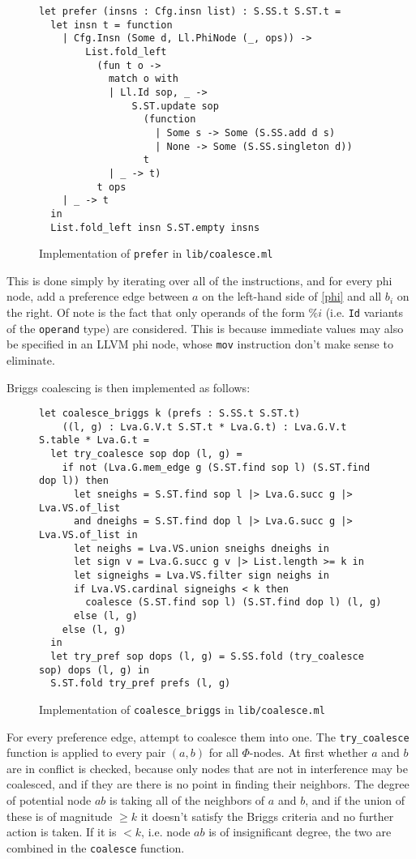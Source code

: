 \documentclass{article}
\begin{document}
\begin{figure}[H]
  \centering
  \begin{verbatim}
let prefer (insns : Cfg.insn list) : S.SS.t S.ST.t =
  let insn t = function
    | Cfg.Insn (Some d, Ll.PhiNode (_, ops)) ->
        List.fold_left
          (fun t o ->
            match o with
            | Ll.Id sop, _ ->
                S.ST.update sop
                  (function
                    | Some s -> Some (S.SS.add d s)
                    | None -> Some (S.SS.singleton d))
                  t
            | _ -> t)
          t ops
    | _ -> t
  in
  List.fold_left insn S.ST.empty insns
  \end{verbatim}
  \caption{Implementation of \texttt{prefer} in \texttt{lib/coalesce.ml}}\label{fig:prefer.ml}
\end{figure}
\noindent This is done simply by iterating over all of the instructions, and for every phi node, add a preference edge between \(a\) on the left-hand side of \eqref{phi} and all \(b_i\) on the right. Of note is the fact that only operands of the form \(\%i\) (i.e. \texttt{Id} variants of the \texttt{operand} type) are considered. This is because immediate values may also be specified in an LLVM phi node, whose \texttt{mov} instruction  don't make sense to eliminate. %

Briggs coalescing is then implemented as follows:
\begin{figure}[H]
  \centering
  \begin{verbatim}
let coalesce_briggs k (prefs : S.SS.t S.ST.t)
    ((l, g) : Lva.G.V.t S.ST.t * Lva.G.t) : Lva.G.V.t S.table * Lva.G.t =
  let try_coalesce sop dop (l, g) =
    if not (Lva.G.mem_edge g (S.ST.find sop l) (S.ST.find dop l)) then
      let sneighs = S.ST.find sop l |> Lva.G.succ g |> Lva.VS.of_list
      and dneighs = S.ST.find dop l |> Lva.G.succ g |> Lva.VS.of_list in
      let neighs = Lva.VS.union sneighs dneighs in
      let sign v = Lva.G.succ g v |> List.length >= k in
      let signeighs = Lva.VS.filter sign neighs in
      if Lva.VS.cardinal signeighs < k then
        coalesce (S.ST.find sop l) (S.ST.find dop l) (l, g)
      else (l, g)
    else (l, g)
  in
  let try_pref sop dops (l, g) = S.SS.fold (try_coalesce sop) dops (l, g) in
  S.ST.fold try_pref prefs (l, g)
  \end{verbatim}
  \caption{Implementation of \texttt{coalesce\_briggs} in \texttt{lib/coalesce.ml}}\label{fig:coalesce_briggs.ml}
\end{figure}
\noindent For every preference edge, attempt to coalesce them into one. The \texttt{try\_coalesce} function is applied to every pair \((a,b)\) for all \(\Phi\text{-nodes}\).
At first whether \(a\) and \(b\) are in conflict is checked, because only nodes that are not in interference may be coalesced, and if they are there is no point in finding their neighbors.
The degree of potential node \(ab\) is taking all of the neighbors  of \(a\) and \(b\), and if the union of these is of magnitude \(\geq k\) it doesn't satisfy the Briggs criteria and no further action is taken. If it is \(<k\), i.e. node \(ab\) is of insignificant degree, the two are combined in the \texttt{coalesce} function.
\end{document}
